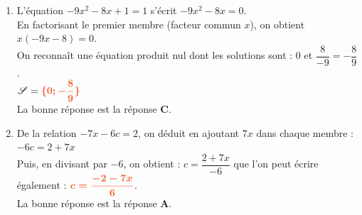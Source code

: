 \documentclass[a4paper,11pt]{article}
\begin{document}
\begin{seanceD}{}
\begin{enumerate}
\item L'équation $-9x^2-8x+1=1$ s'écrit $-9x^2-8x=0$.\\
          En factorisant le premier membre (facteur commun $x$), on obtient $x(-9x-8)=0$.\\
          On reconnaît une équation produit nul dont les solutions sont : $0$ et $\dfrac{8}{-9}=-\dfrac{8}{9}$.\\
          $\mathscr{S}={\color[HTML]{F15929}\boldsymbol{\{0;-\dfrac{8}{9}\}}}$\\La bonne réponse est la réponse {\bfseries \color[HTML]{F15929}C}.

\item De la relation $-7x-6c=2$, on déduit en ajoutant $7x$ dans chaque membre :
          $-6c=2+7x$\\ Puis, en divisant par $-6$, on obtient : $c=\dfrac{2+7x}{-6}$ que l'on peut écrire également : ${\color[HTML]{F15929}\boldsymbol{ c=\dfrac{-2-7x}{6}}}$.\\La bonne réponse est la réponse {\bfseries \color[HTML]{F15929}A}.

\end{enumerate}

\end{seanceD}
\end{document}

